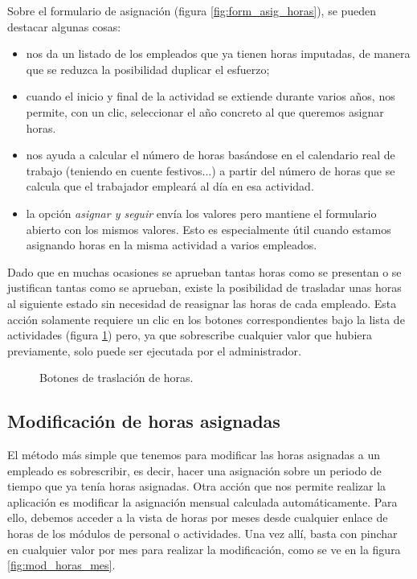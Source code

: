 Sobre el formulario de asignación (figura \ref{fig:form_asig_horas}), se pueden
destacar algunas cosas:

\begin{itemize}
 \item nos da un listado
de los empleados que ya tienen horas imputadas, de manera que se reduzca la
posibilidad duplicar el esfuerzo;
 \item cuando el inicio y final de la actividad se extiende durante varios
años, nos permite, con un clic, seleccionar el año concreto al que queremos
asignar horas.
 \item nos ayuda a calcular el número de horas basándose en el calendario real
de trabajo (teniendo en cuente festivos...) a partir del número de horas que se
calcula que el trabajador empleará al día en esa actividad.
 \item la opción \textit{asignar y seguir} envía los valores pero mantiene el
formulario abierto con los mismos valores. Esto es especialmente útil cuando
estamos asignando horas en la misma actividad a varios empleados.
\end{itemize}

Dado que en muchas ocasiones se aprueban tantas horas como se presentan o
se justifican tantas como se aprueban, existe la posibilidad de trasladar unas
horas al siguiente estado sin necesidad de reasignar las horas de cada empleado.
Esta acción solamente requiere un clic en los botones correspondientes bajo la
lista de actividades (figura \ref{fig:tras_horas}) pero, ya que sobrescribe
cualquier valor que hubiera previamente, solo puede ser ejecutada por el
administrador.

\begin{figure}
\centering
{}
\caption{Botones de traslación de horas.}
\label{fig:tras_horas}
\end{figure}

\subsection{Modificación de horas asignadas}

El método más simple que tenemos para modificar las horas asignadas a un
empleado es sobrescribir, es decir, hacer una asignación sobre un periodo de
tiempo que ya tenía horas asignadas. Otra acción que nos permite realizar la
aplicación es modificar la asignación mensual calculada automáticamente. Para
ello, debemos acceder a la vista de horas por meses desde cualquier enlace de
horas de los módulos de personal o actividades. Una vez allí, basta con pinchar
en cualquier valor por mes para realizar la modificación, como se ve en la
figura \ref{fig:mod_horas_mes}.

